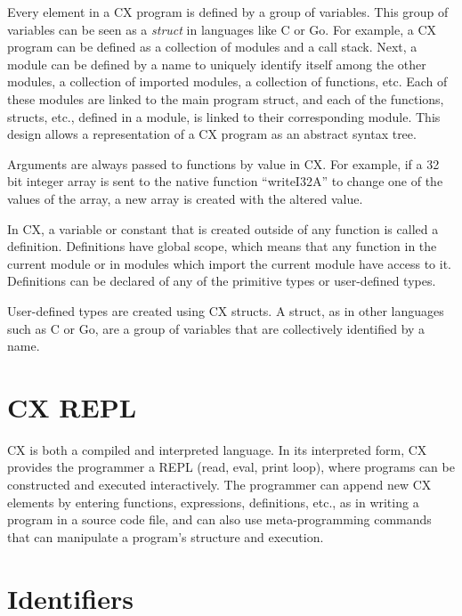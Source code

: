Every element in a CX program is defined by a group of variables. This
group of variables can be seen as a \textit{struct} in languages like
C or Go. For example, a CX program can be defined as a collection of
modules and a call stack. Next, a module can be defined by a name to
uniquely identify itself among the other modules, a collection of
imported modules, a collection of functions, etc. Each of these
modules are linked to the main program struct, and each of the
functions, structs, etc., defined in a module, is linked to their
corresponding module. This design allows a representation of a CX
program as an abstract syntax tree.

Arguments are always passed to functions by value in CX. For example,
if a 32 bit integer array is sent to the native function ``writeI32A''
to change one of the values of the array, a new array is created with
the altered value.

In CX, a variable or constant that is created outside of any function
is called a definition. Definitions have global scope, which means
that any function in the current module or in modules which import the
current module have access to it. Definitions can be declared of any
of the primitive types or user-defined types.

User-defined types are created using CX structs. A struct, as in
other languages such as C or Go, are a group of variables that
are collectively identified by a name.


\section{CX REPL}
\label{cx-repl}

CX is both a compiled and interpreted language. In its interpreted
form, CX provides the programmer a REPL (read, eval, print loop),
where programs can be constructed and executed interactively. The
programmer can append new CX elements by entering functions,
expressions, definitions, etc., as in writing a program in a source
code file, and can also use meta-programming commands that can
manipulate a program's structure and execution.

\section{Identifiers}
\label{identifiers}

